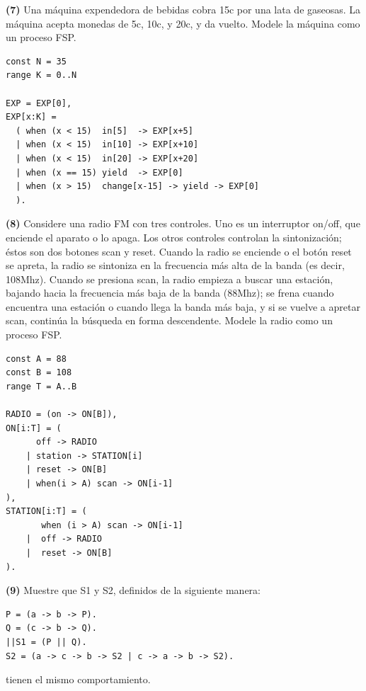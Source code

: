 \documentclass[a4paper, 12pt]{article}
\begin{document}
\pagebreak 

\begin{myframe}
\textbf{(7)} Una máquina expendedora de bebidas cobra 15c por una lata de
gaseosas. La máquina acepta monedas de 5c, 10c, y 20c, y da vuelto. Modele la
máquina como un proceso FSP.
\end{myframe}

\begin{verbatim}
const N = 35
range K = 0..N

EXP = EXP[0],
EXP[x:K] = 
  ( when (x < 15)  in[5]  -> EXP[x+5]
  | when (x < 15)  in[10] -> EXP[x+10]
  | when (x < 15)  in[20] -> EXP[x+20]
  | when (x == 15) yield  -> EXP[0]
  | when (x > 15)  change[x-15] -> yield -> EXP[0]
  ).
\end{verbatim}

\pagebreak 

\begin{myframe}
    \textbf{(8)} Considere una radio FM con tres controles. Uno es un
    interruptor on/off, que enciende el aparato o lo apaga. Los otros controles
    controlan la sintonización; éstos son dos botones scan y reset. Cuando la
    radio se enciende o el botón reset se apreta, la radio se sintoniza en la
    frecuencia más alta de la banda (es decir, 108Mhz). Cuando se presiona
    scan, la radio empieza a buscar una estación, bajando hacia la frecuencia
    más baja de la banda (88Mhz); se frena cuando encuentra una estación o
    cuando llega la banda más baja, y si se vuelve a apretar scan, continúa la
    búsqueda en forma descendente. Modele la radio como un proceso FSP.
\end{myframe}

\begin{verbatim}
const A = 88
const B = 108
range T = A..B

RADIO = (on -> ON[B]),
ON[i:T] = (
	  off -> RADIO
	| station -> STATION[i]
	| reset -> ON[B]
	| when(i > A) scan -> ON[i-1]
),
STATION[i:T] = (
	   when (i > A) scan -> ON[i-1]
	|  off -> RADIO
	|  reset -> ON[B]
).

\end{verbatim}


\pagebreak 

\begin{myframe}
    \textbf{(9)} Muestre que S1 y S2, definidos de la siguiente manera:

\begin{verbatim}
P = (a -> b -> P).
Q = (c -> b -> Q).
||S1 = (P || Q).
S2 = (a -> c -> b -> S2 | c -> a -> b -> S2).
\end{verbatim}

tienen el mismo comportamiento.
\end{myframe}
\end{document}
